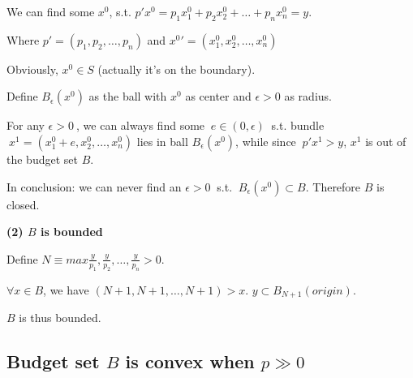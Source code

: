 \documentclass{article}
\begin{document}
\vspace{2mm}

We can find some $x^0$, s.t. $p'x^0 = p_1x^0_1 + p_2x^0_2 + \ldots + p_nx^0_n = y$.

Where $p' = (p_1, p_2, \ldots, p_n)$ and ${x^0}' = (x^0_1, x^0_2, \ldots, x^0_n)$

Obviously, $x^0 \in  S$ (actually it's on the boundary).

\medskip

Define $B_{\epsilon}(x^0)$ as the ball with $x^0$ as center and $\epsilon > 0$ as radius.

For any $\epsilon > 0 \ $, we can always find some $ \ e \in (0, \epsilon) \ $ s.t. bundle 
$\ x^1 = (x^0_1 + e, x^0_2, \ldots, x^0_n)$ lies in ball $B_{\epsilon}(x^0)$, while since $\ p'x^1 > y$, 
$x^1$ is out of the budget set $B$.

\medskip

In conclusion: we can never find an $\epsilon > 0 \ $ s.t. $\ B_{\epsilon}(x^0) \subset B$. Therefore
$B$ is closed.

\bigskip

\textbf{(2) $B$ is bounded}

{\centering
{}
\label{fig:1_15_bounded}}

\vspace{2mm}

Define $N \equiv max{\frac{y}{p_1},\frac{y}{p_2},\ldots, \frac{y}{p_n}} > 0$.

$\forall x \in B$, we have $(N+1,N+1, \ldots, N+1) > x$. $y \subset B_{N+1}(origin)$.

$B$ is thus bounded.

\subsection{Budget set $B$ is convex when $p \gg 0$}
\end{document}
